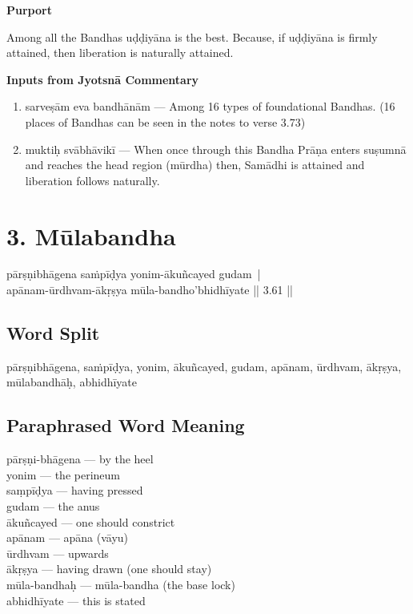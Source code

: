 \noindent \textbf{Purport}

Among all the Bandhas uḍḍiyāna is the best. Because, if uḍḍiyāna is firmly attained, then liberation is naturally attained. 

\noindent \textbf{Inputs from Jyotsnā Commentary}

\begin{enumerate}
\item sarveṣām eva bandhānām --- Among 16 types of foundational Bandhas. (16 places of Bandhas can be seen in the notes to verse 3.73)
\item muktiḥ svābhāvikī --- When once through this Bandha Prāṇa enters suṣumnā and reaches the head region (mūrdha) then, Samādhi is attained and liberation follows naturally. 
\end{enumerate}
\newpage

\section*{3. Mūlabandha}

\begin{shloka}
pārṣṇibhāgena saṁpīḍya yonim-ākuñcayed gudam |\\
apānam-ūrdhvam-ākṛṣya mūla-bandho'bhidhīyate || 3.61 ||
\end{shloka}

\subsection*{Word Split}

pārṣṇibhāgena, saṁpīḍya, yonim, ākuñcayed, gudam, apānam, ūrdhvam, ākṛṣya, mūlabandhāḥ, abhidhīyate

\subsection*{Paraphrased Word Meaning}

\begin{multicols}{2}
pārṣṇi-bhāgena --- by the heel\\
yonim --- the perineum \\
saṃpīḍya --- having pressed \\ 
gudam --- the anus  \\
ākuñcayed --- one should constrict\\
apānam --- apāna (vāyu)\\
ūrdhvam --- upwards \\
ākṛṣya --- having drawn (one should stay)\\
mūla-bandhaḥ --- mūla-bandha (the base lock)\\
abhidhīyate --- this is stated 
\end{multicols}

